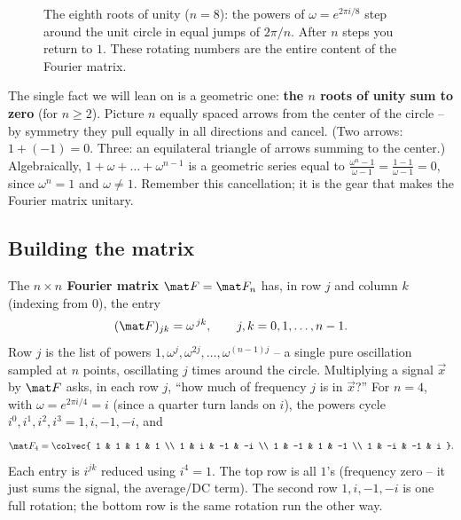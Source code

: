 \begin{figure}[H]
\centering
{}
\caption{The eighth roots of unity ($n=8$): the powers of $\omega=e^{2\pi i/8}$ step
around the unit circle in equal jumps of $2\pi/n$. After $n$ steps you return to
$1$. These rotating numbers are the entire content of the Fourier matrix.}
\label{ch32:roots}
\end{figure}

The single fact we will lean on is a geometric one: \textbf{the $n$ roots of unity
sum to zero} (for $n\ge 2$). Picture $n$ equally spaced arrows from the center of
the circle -- by symmetry they pull equally in all directions and cancel. (Two
arrows: $1+(-1)=0$. Three: an equilateral triangle of arrows summing to the
center.) Algebraically, $1+\omega+\dots+\omega^{n-1}$ is a geometric series equal
to $\frac{\omega^n - 1}{\omega-1} = \frac{1-1}{\omega-1}=0$, since $\omega^n=1$ and
$\omega\ne 1$. Remember this cancellation; it is the gear that makes the Fourier
matrix unitary.

\subsection{Building the matrix}

The \textbf{$n\times n$ Fourier matrix} $\mat F = \mat F_n$ has, in row $j$ and
column $k$ (indexing from $0$), the entry
\[
  (\mat F)_{jk} = \omega^{\,jk}, \qquad j,k = 0,1,\dots,n-1.
\]
Row $j$ is the list of powers $1,\omega^j,\omega^{2j},\dots,\omega^{(n-1)j}$ -- a
single pure oscillation sampled at $n$ points, oscillating $j$ times around the
circle. Multiplying a signal $\vec x$ by $\mat F$ asks, in each row $j$, ``how much
of frequency $j$ is in $\vec x$?'' For $n=4$, with $\omega = e^{2\pi i/4} = i$
(since a quarter turn lands on $i$), the powers cycle $i^0,i^1,i^2,i^3 =
1,i,-1,-i$, and
\[
  \mat F_4 = \colvec{
    1 & 1 & 1 & 1 \\
    1 & i & -1 & -i \\
    1 & -1 & 1 & -1 \\
    1 & -i & -1 & i }.
\]
Each entry is $i^{jk}$ reduced using $i^4=1$. The top row is all $1$'s (frequency
zero -- it just sums the signal, the average/DC term). The second row $1,i,-1,-i$
is one full rotation; the bottom row is the same rotation run the other way.

